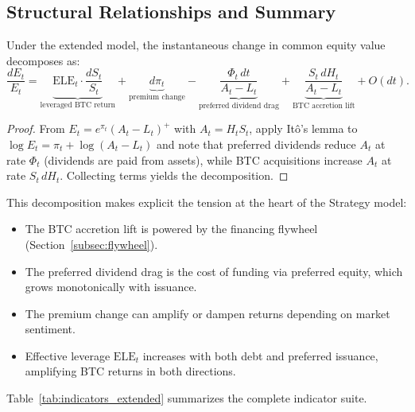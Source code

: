 \subsection{Structural Relationships and Summary}\label{subsec:summary}

\begin{theorem}\label{thm:flywheel_decomp}
Under the extended model, the instantaneous change in common equity value
decomposes as:
\begin{equation}\label{eq:equity_decomp}
  \frac{dE_t}{E_t}
  = \underbrace{\mathrm{ELE}_t \cdot \frac{dS_t}{S_t}}_{\text{leveraged BTC return}}
  + \underbrace{d\pi_t}_{\text{premium change}}
  - \underbrace{\frac{\Phi_t\,dt}{A_t - L_t}}_{\text{preferred dividend drag}}
  + \underbrace{\frac{S_t\,dH_t}{A_t - L_t}}_{\text{BTC accretion lift}}
  + O(dt).
\end{equation}
\end{theorem}

\begin{proof}
From $E_t = e^{\pi_t}(A_t - L_t)^+$ with $A_t = H_t S_t$, apply It\^{o}'s
lemma to $\log E_t = \pi_t + \log(A_t - L_t)$ and note that preferred
dividends reduce $A_t$ at rate $\Phi_t$ (dividends are paid from assets),
while BTC acquisitions increase $A_t$ at rate $S_t\,dH_t$.  Collecting
terms yields the decomposition.
\end{proof}

\noindent This decomposition makes explicit the tension at the heart of
the Strategy model:
\begin{itemize}
  \item The BTC accretion lift is powered by the financing flywheel
        (Section~\ref{subsec:flywheel}).
  \item The preferred dividend drag is the cost of funding via preferred
        equity, which grows monotonically with issuance.
  \item The premium change can amplify or dampen returns depending on
        market sentiment.
  \item Effective leverage $\mathrm{ELE}_t$ increases with both debt and
        preferred issuance, amplifying BTC returns in both directions.
\end{itemize}

Table~\ref{tab:indicators_extended} summarizes the complete indicator suite.

